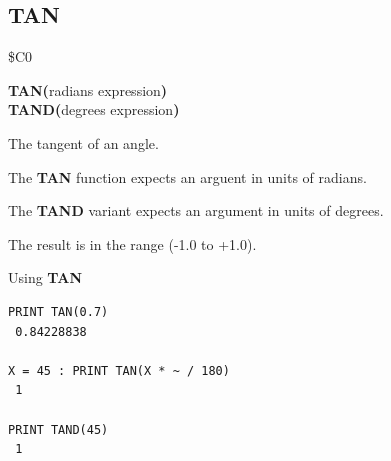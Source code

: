 \subsection{TAN}
\begin{description}[leftmargin=2cm,style=nextline]
\item [Token:]    \$C0

\item [Format:]   {\bf TAN(}radians expression{\bf )} \\
                  {\bf TAND(}degrees expression{\bf )}

\item [Returns:]  The tangent of an angle.

                  The {\bf TAN} function expects an arguent in units of radians.

                  The {\bf TAND} variant expects an argument in units of degrees.

                  The result is in the range (-1.0 to +1.0).

\item [Example:]  Using {\bf TAN}

\begin{tcolorbox}[colback=black,coltext=white]
\verbatimfont{\codefont}
\begin{verbatim}
PRINT TAN(0.7)
 0.84228838

X = 45 : PRINT TAN(X * ~ / 180)
 1

PRINT TAND(45)
 1
\end{verbatim}
\end{tcolorbox}
\end{description}


\newpage
